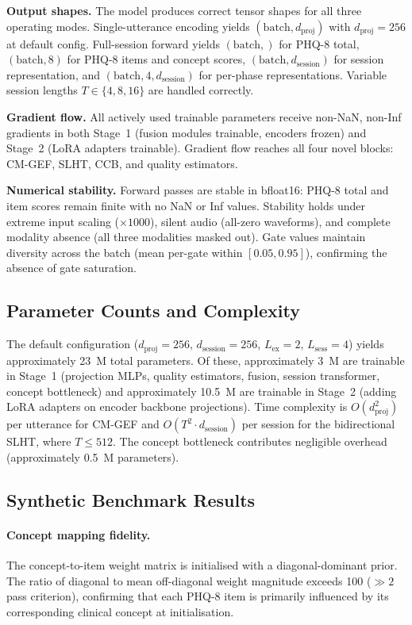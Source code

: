\documentclass{article}
\begin{document}
\textbf{Output shapes.} The model produces correct tensor shapes for all three operating
modes. Single-utterance encoding yields $(\text{batch}, d_{\text{proj}})$ with
$d_{\text{proj}} = 256$ at default config. Full-session forward yields
$(\text{batch},)$ for PHQ-8 total, $(\text{batch}, 8)$ for PHQ-8 items and concept
scores, $(\text{batch}, d_{\text{session}})$ for session representation, and
$(\text{batch}, 4, d_{\text{session}})$ for per-phase representations. Variable
session lengths $T \in \{4, 8, 16\}$ are handled correctly.

\textbf{Gradient flow.} All actively used trainable parameters receive non-NaN,
non-Inf gradients in both Stage~1 (fusion modules trainable, encoders frozen) and
Stage~2 (LoRA adapters trainable). Gradient flow reaches all four novel blocks:
CM-GEF, SLHT, CCB, and quality estimators.

\textbf{Numerical stability.} Forward passes are stable in bfloat16: PHQ-8 total and
item scores remain finite with no NaN or Inf values. Stability holds under extreme
input scaling ($\times 1000$), silent audio (all-zero waveforms), and complete modality
absence (all three modalities masked out). Gate values maintain diversity across the
batch (mean per-gate within $[0.05, 0.95]$), confirming the absence of gate saturation.

\subsection{Parameter Counts and Complexity}

The default configuration ($d_{\text{proj}} = 256$, $d_{\text{session}} = 256$,
$L_{\text{ex}} = 2$, $L_{\text{sess}} = 4$) yields approximately 23~M total parameters.
Of these, approximately 3~M are trainable in Stage~1 (projection MLPs, quality
estimators, fusion, session transformer, concept bottleneck) and approximately 10.5~M
are trainable in Stage~2 (adding LoRA adapters on encoder backbone projections).
Time complexity is $O(d_{\text{proj}}^2)$ per utterance for CM-GEF and
$O(T^2 \cdot d_{\text{session}})$ per session for the bidirectional SLHT, where
$T \leq 512$. The concept bottleneck contributes negligible overhead (approximately
0.5~M parameters).

\subsection{Synthetic Benchmark Results}

\paragraph{Concept mapping fidelity.} The concept-to-item weight matrix is initialised
with a diagonal-dominant prior. The ratio of diagonal to mean off-diagonal weight
magnitude exceeds 100 ($\gg 2$ pass criterion), confirming that each PHQ-8 item is
primarily influenced by its corresponding clinical concept at initialisation.
\end{document}
